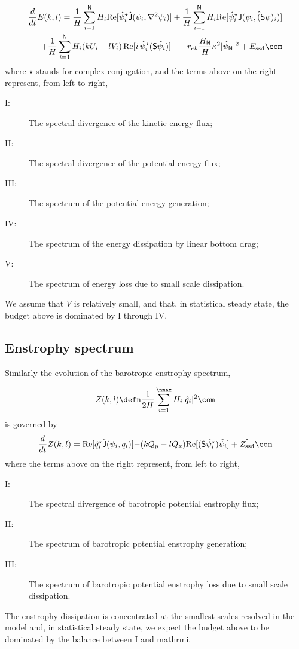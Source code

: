 \documentclass[11pt]{article}
\newcommand{\ssd}{\text{ssd}}
\newcommand{\sS}{\mathsf{S}}
\begin{document}
\begin{align}
    \frac{d}{dt} E(k,l) = {\frac{1}{H}\sum_{i=1}^{\mathsf{N}} H_i \text{Re}[\hat{\psi}_i^\star {\mathsf{\hat{J}}}(\psi_i,\nabla^2\psi_i)]} +
    {\frac{1}{H}\sum_{i=1}^{\mathsf{N}} H_i\text{Re}[\hat{\psi}_i^\star \hat{\mathsf{J} (\psi_i,(\sS \psi)_i)}]} \nonumber \\
    + {\frac{1}{H}\sum_{i=1}^{\mathsf{N}} H_i ( k U_i +  l V_i)\, \text{Re}[i \, \hat{\psi}^\star_i (\mathsf{S}\hat{\psi}_i)]} \,\,\,\,\,\,\,{- r_{ek} \frac{H_\mathsf{N}}{H} \kappa^2 |\hat{\psi}_{\mathsf{N}}|^2}  +{ {{E_\ssd}}} \com
\end{align}
where $\star$ stands for complex conjugation, and the terms above on the right represent, from
left to right,

\begin{description}
    \item[I:]  The spectral divergence of the kinetic energy flux;
    \item[II:] The spectral divergence of the potential energy flux; 
    \item[III:] The spectrum of the potential energy generation;
    \item[IV:] The spectrum of the energy dissipation by linear bottom drag;
    \item[V:] The spectrum of energy loss due to small scale dissipation.
\end{description}
We assume that $V$ is relatively small, and that, in statistical steady state, the
budget above is dominated by I through IV.

\subsection*{Enstrophy spectrum}
Similarly the evolution of the barotropic enstrophy spectrum,

\begin{equation}
Z(k,l) \defn \frac{1}{2H} \sum_{i=1}^{\nmax} H_i |\hat{q}_i|^2\com
\end{equation}
is governed by
\begin{equation}
    \frac{d}{d t} Z(k,l) = {\text{Re}[\hat{q}_i^\star {\mathsf{\hat{J}}(\psi_i,q_i) ]}}
    {-(k Q_y - l Q_x)\text{Re}[(\sS \hat{\psi}_i^\star)\hat{\psi}_i]}
    + { {\hat{Z_\ssd}}}\com
\end{equation}
where the terms above on the right represent, from
left to right,
\begin{description}
    \item[I:]   The spectral divergence of barotropic potential enstrophy flux;
    \item[II:]  The spectrum of  barotropic potential enstrophy generation;
    \item[III:] The spectrum of  barotropic potential enstrophy loss due to small scale dissipation.
\end{description}
The enstrophy dissipation is concentrated at the smallest scales resolved in the model and, in statistical steady
state, we expect the budget above to be dominated by the balance between I and mathrm{i}.
\end{document}
